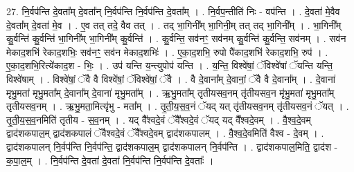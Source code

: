 \documentclass[17pt]{extarticle}
\begin{document}
27. नि॒र्वप॑न्ति दे॒वता᳚म् दे॒वता᳚न् नि॒र्वप॑न्ति नि॒र्वप॑न्ति दे॒वता᳚म् । . नि॒र्वप॒न्तीति॑ निः - वप॑न्ति । . दे॒वता॑ मे॒वैव दे॒वता᳚म् दे॒वता॑ मे॒व । . ए॒व तत् तदे॒ वैव तत् । . तद् भा॒गिनी᳚म् भा॒गिनी॒म् तत् तद् भा॒गिनी᳚म् । . भा॒गिनी᳚म् कु॒र्वन्ति॑ कु॒र्वन्ति॑ भा॒गिनी᳚म् भा॒गिनी᳚म् कु॒र्वन्ति॑ । . कु॒र्वन्ति॒ सव॑नꣳ॒॒ सव॑नम् कु॒र्वन्ति॑ कु॒र्वन्ति॒ सव॑नम् । . सव॑न मेकाद॒शभि॑ रेकाद॒शभिः॒ सव॑नꣳ॒॒ सव॑न मेकाद॒शभिः॑ । . ए॒का॒द॒शभि॒ रुपो पै॑काद॒शभि॑ रेकाद॒शभि॒ रुप॑ । . ए॒का॒द॒शभि॒रित्ये॑काद॒श - भिः॒ । . उप॑ यन्ति य॒न्त्युपोप॑ यन्ति । . य॒न्ति॒ विश्वे॑षां॒ ॅविश्वे॑षां ॅयन्ति यन्ति॒ विश्वे॑षाम् । . विश्वे॑षां॒ ॅवै वै विश्वे॑षां॒ ॅविश्वे॑षां॒ ॅवै । . वै दे॒वाना᳚म् दे॒वानां॒ ॅवै वै दे॒वाना᳚म् । . दे॒वाना॑ मृभु॒मता॑ मृभु॒मता᳚म् दे॒वाना᳚म् दे॒वाना॑ मृभु॒मता᳚म् । . ऋ॒भु॒मता᳚म् तृतीयसव॒नम् तृ॑तीयसव॒न मृ॑भु॒मता॑ मृभु॒मता᳚म् तृतीयसव॒नम् । . ऋ॒भु॒मता॒मित्यृ॑भु - मता᳚म् । . तृ॒ती॒य॒स॒व॒नं ॅयद् यत् तृ॑तीयसव॒नम् तृ॑तीयसव॒नं ॅयत् । . तृ॒ती॒य॒स॒व॒नमिति॑ तृतीय - स॒व॒नम् । . यद् वै᳚श्वदे॒वं ॅवै᳚श्वदे॒वं ॅयद् यद् वै᳚श्वदे॒वम् । . वै॒श्व॒दे॒वम् द्वाद॑शकपाल॒म् द्वाद॑शकपालं ॅवैश्वदे॒वं ॅवै᳚श्वदे॒वम् द्वाद॑शकपालम् । . वै॒श्व॒दे॒वमिति॑ वैश्व - दे॒वम् । . द्वाद॑शकपालन् नि॒र्वप॑न्ति नि॒र्वप॑न्ति॒ द्वाद॑शकपाल॒म् द्वाद॑शकपालन् नि॒र्वप॑न्ति । . द्वाद॑शकपाल॒मिति॒ द्वाद॑श - क॒पा॒ल॒म् । . नि॒र्वप॑न्ति दे॒वता॑ दे॒वता॑ नि॒र्वप॑न्ति नि॒र्वप॑न्ति दे॒वताः᳚ । \newline
\end{document}
